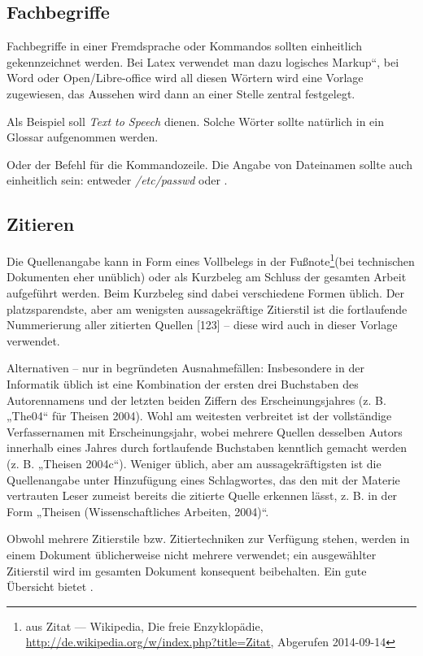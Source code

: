 \subsection{Fachbegriffe}

Fachbegriffe in einer Fremdsprache oder Kommandos sollten einheitlich
gekennzeichnet werden. Bei Latex verwendet man dazu \quotedblbase logisches
Markup``, bei Word oder Open/Libre-office wird all diesen Wörtern
wird eine Vorlage zugewiesen, das Aussehen wird dann an einer Stelle
zentral festgelegt. 

Als Beispiel soll \emph{Text to Speech}
dienen. Solche Wörter sollte natürlich in ein Glossar aufgenommen
werden. 

Oder der Befehl  für die Kommandozeile. Die Angabe von
Dateinamen sollte auch einheitlich sein: entweder \emph{/etc/passwd}
oder .


\subsection{Zitieren}

Die Quellenangabe kann in Form eines Vollbelegs in der Fußnote\footnote{aus Zitat --- Wikipedia, Die freie Enzyklopädie, \url{http://de.wikipedia.org/w/index.php?title=Zitat},
Abgerufen 2014-09-14}(bei technischen Dokumenten eher unüblich) oder als Kurzbeleg am Schluss
der gesamten Arbeit aufgeführt werden. Beim Kurzbeleg sind dabei verschiedene
Formen üblich. Der platzsparendste, aber am wenigsten aussagekräftige
Zitierstil ist die fortlaufende Nummerierung aller zitierten Quellen
{[}123{]} -- diese wird auch in dieser Vorlage verwendet.

Alternativen -- nur in begründeten Ausnahmefällen: Insbesondere in
der Informatik üblich ist eine Kombination der ersten drei Buchstaben
des Autorennamens und der letzten beiden Ziffern des Erscheinungsjahres
(z. B. „The04“ für Theisen 2004). Wohl am weitesten verbreitet ist
der vollständige Verfassernamen mit Erscheinungsjahr, wobei mehrere
Quellen desselben Autors innerhalb eines Jahres durch fortlaufende
Buchstaben kenntlich gemacht werden (z. B. „Theisen 2004c“). Weniger
üblich, aber am aussagekräftigsten ist die Quellenangabe unter Hinzufügung
eines Schlagwortes, das den mit der Materie vertrauten Leser zumeist
bereits die zitierte Quelle erkennen lässt, z. B. in der Form „Theisen
(Wissenschaftliches Arbeiten, 2004)“.

Obwohl mehrere Zitierstile bzw. Zitiertechniken zur Verfügung stehen,
werden in einem Dokument üblicherweise nicht mehrere verwendet; ein
ausgewählter Zitierstil wird im gesamten Dokument konsequent beibehalten.
Ein gute Übersicht bietet \citep{wiki:zitat}.

